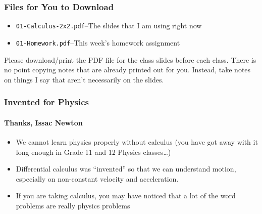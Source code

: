 \documentclass[12pt,compress,aspectratio=169]{beamer}
\begin{document}
\begin{frame}
  \frametitle{Files for You to Download}
  \begin{itemize}
  \item\texttt{01-Calculus-2x2.pdf}--The slides that I am using right now
  \item\texttt{01-Homework.pdf}--This week's homework assignment
  \end{itemize}
  Please download/print the PDF file for the class slides before each class.
  There is no point copying notes that are already printed out for you.
  Instead, take notes on things I say that aren't necessarily on the slides.
\end{frame}

\begin{frame}
  \frametitle{Invented for Physics}
  \framesubtitle{Thanks, Issac Newton}
  \begin{itemize}
  \item We cannot learn physics properly without calculus (you have got
    away with it long enough in Grade 11 and 12 Physics classes\ldots)
  \item Differential calculus was ``invented'' so that we can understand
    motion, especially on non-constant velocity and acceleration.
  \item If you are taking calculus, you may have noticed that a lot of the
    word problems are really physics problems
  \end{itemize}
\end{frame}
\end{document}
